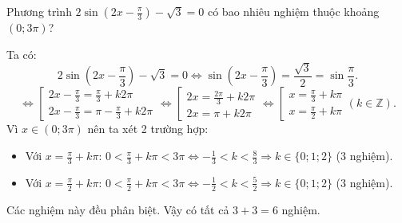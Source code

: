 \begin{baitap}
	Phương trình $2\sin\left(2x - \frac{\pi}{3}\right) - \sqrt{3} = 0$ có bao nhiêu nghiệm thuộc khoảng $(0; 3\pi)$?
	\begin{traloi}
		Ta có:
		\[
		2\sin\left(2x - \frac{\pi}{3}\right) - \sqrt{3} = 0 \Leftrightarrow \sin\left(2x - \frac{\pi}{3}\right) = \frac{\sqrt{3}}{2} = \sin\frac{\pi}{3}.
		\]
		\[
		\Leftrightarrow \left[ \begin{array}{l} 2x - \frac{\pi}{3} = \frac{\pi}{3} + k2\pi \\ 2x - \frac{\pi}{3} = \pi - \frac{\pi}{3} + k2\pi \end{array} \right. \Leftrightarrow \left[ \begin{array}{l} 2x = \frac{2\pi}{3} + k2\pi \\ 2x = \pi + k2\pi \end{array} \right. \Leftrightarrow \left[ \begin{array}{l} x = \frac{\pi}{3} + k\pi \\ x = \frac{\pi}{2} + k\pi \end{array} \right. (k \in \mathbb{Z}).
		\]
		Vì $x \in (0; 3\pi)$ nên ta xét 2 trường hợp:
		\begin{itemize}
			\item Với $x = \frac{\pi}{3} + k\pi$: $0 < \frac{\pi}{3} + k\pi < 3\pi \Leftrightarrow -\frac{1}{3} < k < \frac{8}{3} \Rightarrow k \in \{0; 1; 2\}$ ($3$ nghiệm).
		\item Với $x = \frac{\pi}{2} + k\pi$: $0 < \frac{\pi}{2} + k\pi < 3\pi \Leftrightarrow -\frac{1}{2} < k < \frac{5}{2} \Rightarrow k \in \{0; 1; 2\}$ ($3$ nghiệm).
		\end{itemize}
		Các nghiệm này đều phân biệt. Vậy có tất cả $3 + 3 = 6$ nghiệm.
	\end{traloi}
\end{baitap}

